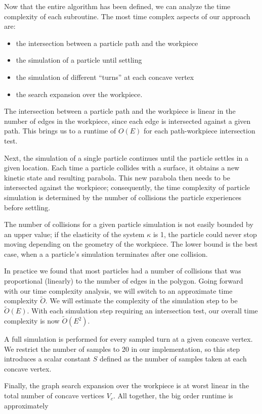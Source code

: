 Now that the entire algorithm has been defined, we can analyze the time complexity of each subroutine. The most time complex aspects of our approach are:

\begin{itemize}
\item the intersection between a particle path and the workpiece
\item the simulation of a particle until settling
\item the simulation of different ``turns'' at each concave vertex
\item the search expansion over the workpiece.
\end{itemize}

The intersection between a particle path and the workpiece is linear in the number of edges in the workpiece, since each edge is intersected against a given path. This brings us to a runtime of $O(E)$ for each path-workpiece intersection test.

Next, the simulation of a single particle continues until the particle settles in a given location. Each time a particle collides with a surface, it obtains a new kinetic state and resulting parabola. This new parabola then needs to be intersected against the workpiece; consequently, the time complexity of particle simulation is determined by the number of collisions the particle experiences before settling.

The number of collisions for a given particle simulation is not easily bounded by an upper value; if the elasticity of the system $\kappa$ is 1, the particle could never stop moving depending on the geometry of the workpiece. The lower bound is the best case, when a a particle's simulation terminates after one collision.

In practice we found that most particles had a number of collisions that was proportional (linearly) to the number of edges in the polygon. Going forward with our time complexity analysis, we will switch to an approximate time complexity $\tilde{O}$. We will estimate the complexity of the simulation step to be $\tilde{O}(E)$. With each simulation step requiring an intersection test, our overall time complexity is now $\tilde{O}(E^2).$

A full simulation is performed for every sampled turn at a given concave vertex. We restrict the number of samples to 20 in our implementation, so this step introduces a scalar constant $S$ defined as the number of samples taken at each concave vertex.

Finally, the graph search expansion over the workpiece is at worst linear in the total number of concave vertices $V_{c}$. All together, the big order runtime is approximately

 {
  \label{eq:bigo}
}
